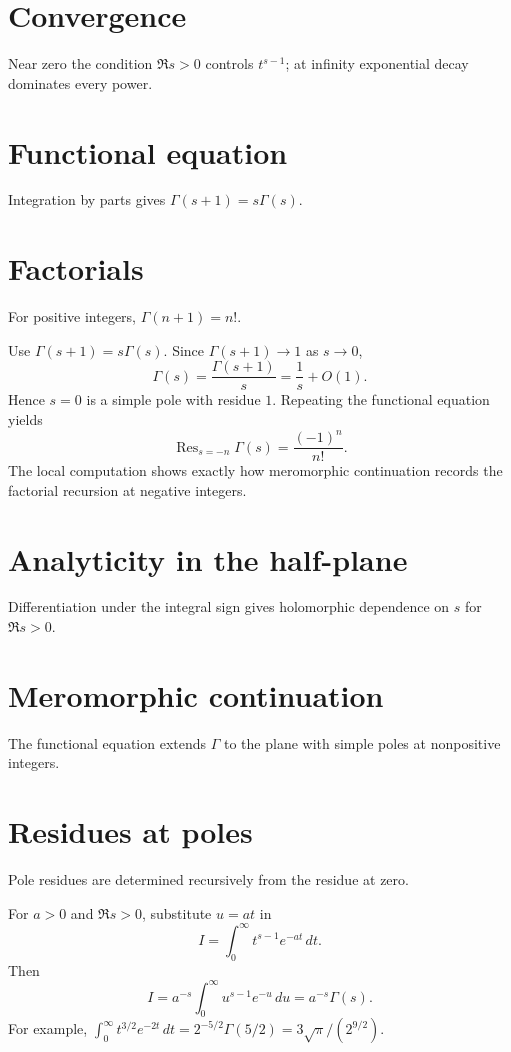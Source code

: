 \section{Convergence}
Near zero the condition $\Re s>0$ controls $t^{s-1}$; at infinity exponential decay dominates every power.

\section{Functional equation}
Integration by parts gives $\Gamma(s+1)=s\Gamma(s)$.

\section{Factorials}
For positive integers, $\Gamma(n+1)=n!$.

\begin{example}\label{ex:iv19-expand-02}
Use \(\Gamma(s+1)=s\Gamma(s)\). Since \(\Gamma(s+1)\to1\) as \(s\to0\),
\[
\Gamma(s)=\frac{\Gamma(s+1)}{s}=\frac1s+O(1).
\]
Hence \(s=0\) is a simple pole with residue \(1\). Repeating the functional equation yields
\[
\operatorname{Res}_{s=-n}\Gamma(s)=\frac{(-1)^n}{n!}.
\]
The local computation shows exactly how meromorphic continuation records the factorial recursion at negative integers.
\end{example}
\section{Analyticity in the half-plane}
Differentiation under the integral sign gives holomorphic dependence on $s$ for $\Re s>0$.

\section{Meromorphic continuation}
The functional equation extends $\Gamma$ to the plane with simple poles at nonpositive integers.

\section{Residues at poles}
Pole residues are determined recursively from the residue at zero.

\begin{example}\label{ex:iv19-expand-03}
For \(a>0\) and \(\Re s>0\), substitute \(u=at\) in
\[
I=\int_0^\infty t^{s-1}e^{-at}\,dt.
\]
Then
\[
I=a^{-s}\int_0^\infty u^{s-1}e^{-u}\,du=a^{-s}\Gamma(s).
\]
For example, \(\int_0^\infty t^{3/2}e^{-2t}\,dt=2^{-5/2}\Gamma(5/2)=3\sqrt{\pi}/(2^{9/2})\).
\end{example}
